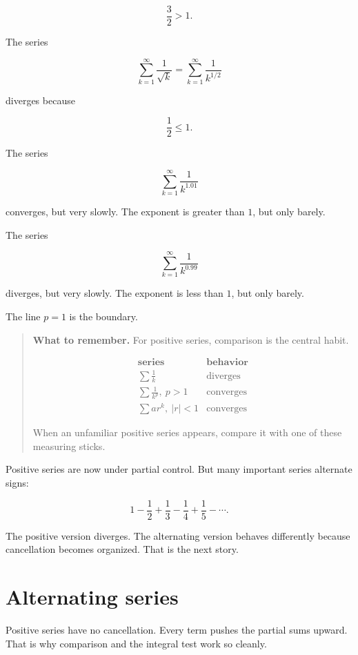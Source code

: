 \[
\frac32>1.
\]

The series

\[
\sum_{k=1}^{\infty}\frac1{\sqrt{k}}
=
\sum_{k=1}^{\infty}\frac1{k^{1/2}}
\]

diverges because

\[
\frac12\le1.
\]

The series

\[
\sum_{k=1}^{\infty}\frac1{k^{1.01}}
\]

converges, but very slowly.  The exponent is greater than \(1\), but only barely.

The series

\[
\sum_{k=1}^{\infty}\frac1{k^{0.99}}
\]

diverges, but very slowly.  The exponent is less than \(1\), but only barely.

The line \(p=1\) is the boundary.

\begin{quote}
\textbf{What to remember.}
For positive series, comparison is the central habit.

\[
\begin{array}{c|c}
\textbf{series} & \textbf{behavior} \\ \hline
\displaystyle \sum \frac1k & \text{diverges} \\[6pt]
\displaystyle \sum \frac1{k^p},\ p>1 & \text{converges} \\[6pt]
\displaystyle \sum ar^k,\ |r|<1 & \text{converges}
\end{array}
\]

When an unfamiliar positive series appears, compare it with one of these measuring
sticks.
\end{quote}

Positive series are now under partial control.  But many important series alternate signs:

\[
1-\frac12+\frac13-\frac14+\frac15-\cdots.
\]

The positive version diverges.  The alternating version behaves differently because
cancellation becomes organized.  That is the next story.

\section{Alternating series}
\label{sec:alternating-series}

Positive series have no cancellation.  Every term pushes the partial sums upward.  That
is why comparison and the integral test work so cleanly.

